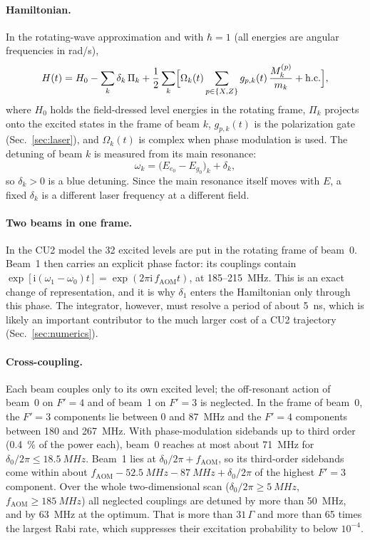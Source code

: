 \documentclass[11pt,a4paper,oneside]{report}
\newcommand{\fAOM}{f_{\mathrm{AOM}}}
\begin{document}
\paragraph{Hamiltonian.} In the rotating-wave approximation and with $\hbar=1$ (all energies
are angular frequencies in rad/s),
\begin{equation}
  H(t)=H_0-\sum_k\delta_k\,\Pi_k
  +\frac12\sum_k\Bigl[\Omega_k(t)\sum_{p\in\{X,Z\}}g_{p,k}(t)\,\frac{M^{(p)}_k}{m_k}
  +\mathrm{h.c.}\Bigr],
  \label{eq:H}
\end{equation}
where $H_0$ holds the field-dressed level energies in the rotating frame, $\Pi_k$ projects
onto the excited states in the frame of beam $k$, $g_{p,k}(t)$ is the polarization gate
(Sec.~\ref{sec:laser}), and $\Omega_k(t)$ is complex when phase modulation is used. The
detuning of beam $k$ is measured from its main resonance:
\begin{equation}
  \omega_k=\bigl(E_{e_0}-E_{g_0}\bigr)_k+\delta_k ,
\end{equation}
so $\delta_k>0$ is a blue detuning. Since the main resonance itself moves with $E$, a
fixed $\delta_k$ is a different laser frequency at a different field.

\paragraph{Two beams in one frame.} In the CU2 model the 32 excited levels are put in the
rotating frame of beam~0. Beam~1 then carries an explicit phase factor: its couplings contain
$\exp[\mathrm i(\omega_1-\omega_0)t]=\exp(2\pi\mathrm i\,\fAOM t)$, at 185--\SI{215}{MHz}.
This is an exact change of representation, and it is why
$\delta_1$ enters the Hamiltonian only through this phase. The integrator, however, must
resolve a period of about \SI{5}{ns}, which is likely an important contributor to the much
larger cost of a CU2 trajectory (Sec.~\ref{sec:numerics}).

\paragraph{Cross-coupling.} Each beam couples only to its own excited level; the off-resonant
action of beam~0 on $F'=4$ and of beam~1 on $F'=3$ is neglected. In the frame of beam~0, the
$F'=3$ components lie between 0 and \SI{87}{MHz} and the $F'=4$ components between 180 and
\SI{267}{MHz}. With phase-modulation sidebands up to third order (\SI{0.4}{\percent} of the
power each), beam~0 reaches at most about \SI{71}{MHz} for $\delta_0/2\pi\leq\SI{18.5}{MHz}$.
Beam~1 lies at $\delta_0/2\pi+\fAOM$, so its third-order sidebands come within about
$\fAOM-\SI{52.5}{MHz}-\SI{87}{MHz}+\delta_0/2\pi$ of the highest $F'=3$ component. Over the
whole two-dimensional scan ($\delta_0/2\pi\geq\SI{5}{MHz}$, $\fAOM\geq\SI{185}{MHz}$) all
neglected couplings are detuned by more than \SI{50}{MHz}, and by \SI{63}{MHz} at the optimum.
That is more than $31\,\Gamma$ and more than 65 times the largest Rabi rate, which suppresses
their excitation probability to below $10^{-4}$.
\end{document}
